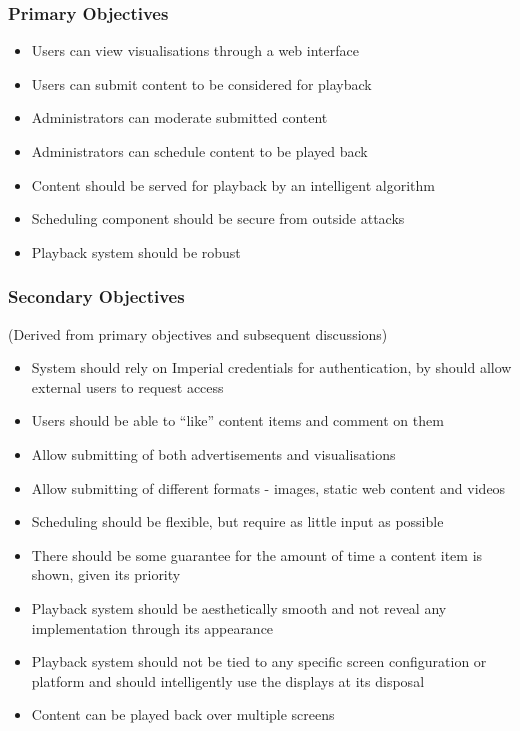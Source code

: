 \documentclass[a4paper, titlepage]{article}
\begin{document}
\subsubsection{Primary Objectives} \label{sec:primary_objectives}
\begin{itemize}
\itemsep-1mm
\item Users can view visualisations through a web interface
\item Users can submit content to be considered for playback
\item Administrators can moderate submitted content
\item Administrators can schedule content to be played back
\item Content should be served for playback by an intelligent algorithm
\item Scheduling component should be secure from outside attacks
\item Playback system should be robust
\end{itemize}

\subsubsection{Secondary Objectives} \label{sec:secondary_objectives}
(Derived from primary objectives and subsequent discussions)

\begin{itemize}
\itemsep-1mm
\item System should rely on Imperial credentials for authentication, by should allow external users to request access
\item Users should be able to ``like'' content items and comment on them
\item Allow submitting of both advertisements and visualisations
\item Allow submitting of different formats - images, static web content and videos
\item Scheduling should be flexible, but require as little input as possible
\item There should be some guarantee for the amount of time a content item is shown, given its priority
\item Playback system should be aesthetically smooth and not reveal any implementation through its appearance
\item Playback system should not be tied to any specific screen configuration or platform and should intelligently use the displays at its disposal
\item Content can be played back over multiple screens
\end{itemize}
\end{document}
